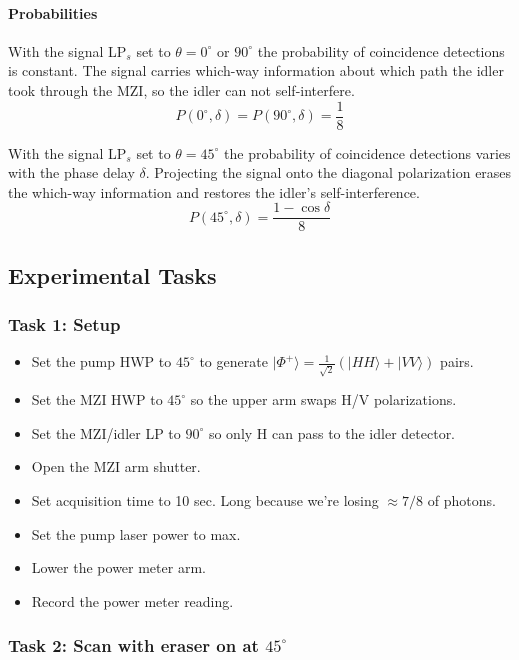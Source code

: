 \documentclass{article}
\begin{document}
\paragraph{Probabilities}

With the signal LP$_s$ set to $\theta=0^\circ$ or $90^\circ$ the probability of
coincidence detections is constant.
The signal carries which-way information about which path the idler took
through the MZI, so the idler can not self-interfere.
\[
P(0^\circ, \delta)=P(90^\circ, \delta)=\frac{1}{8}
\]

With the signal LP$_s$ set to $\theta=45^\circ$ the probability of
coincidence detections varies with the phase delay $\delta$.
Projecting the signal onto the diagonal polarization erases the
which-way information and restores the idler's self-interference.
\[
P(45^\circ, \delta)=\frac{1-\cos\delta}{8}
\]

\subsection*{Experimental Tasks}

\subsubsection*{Task 1: Setup}

\begin{itemize}
\item Set the pump HWP to $45^\circ$ to generate $| \Phi^+ \rangle = \frac{1}{\sqrt2}(|HH\rangle + |VV\rangle)$ pairs.
\item Set the MZI HWP to $45^\circ$ so the upper arm swaps H/V polarizations.
\item Set the MZI/idler LP to $90^\circ$ so only H can pass to the idler detector.
\item Open the MZI arm shutter.
\item Set acquisition time to 10 sec. Long because we're losing $\approx 7/8$ of photons.
\item Set the pump laser power to max.
\item Lower the power meter arm.
\item Record the power meter reading.
\end{itemize}

\subsubsection*{Task 2: Scan with eraser on at $45^\circ$}
\end{document}
